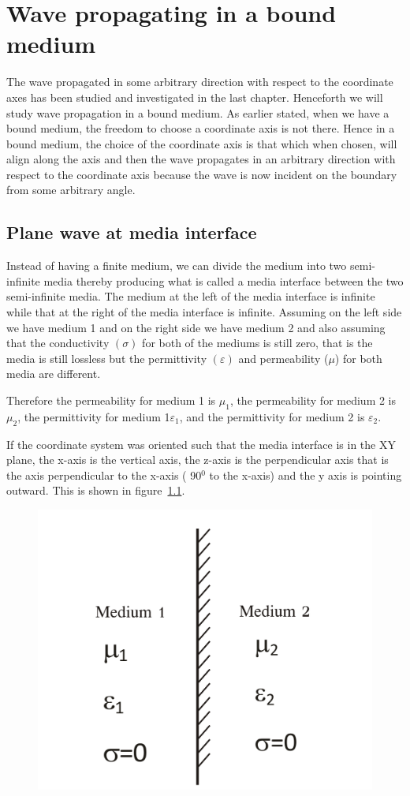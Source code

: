 \chapter{Wave propagating in a bound medium}
The wave propagated in some arbitrary direction with respect to the coordinate axes has been studied and investigated in the last chapter. Henceforth we will study wave propagation in a bound medium. As earlier stated, when we have a bound medium, the freedom to choose a coordinate axis is not there. Hence in a bound medium, the choice of the coordinate axis is that which when chosen, will align along the axis and then the wave propagates in an arbitrary direction with respect to the coordinate axis because the wave is now incident on the boundary from some arbitrary angle.

\section{Plane wave at media interface}

Instead of having a finite medium, we can divide the medium into two semi-infinite media thereby producing what is called a media interface between the two semi-infinite media. The medium at the left of the media interface is infinite while that at the right of the media interface is infinite. Assuming on the left side we have medium 1 and on the right side we have medium 2 and also assuming that the conductivity $(\sigma)$ for both of the mediums is still zero, that is the media is still lossless but the permittivity $(\varepsilon)$ and permeability ($\mu$) for both media are different.

Therefore the permeability for medium 1 is $\mu_1$, the permeability for medium 2 is $\mu_2$, the permittivity for medium 1$\varepsilon_1$, and the permittivity for medium 2 is $\varepsilon_2$.

If the coordinate system was oriented such that the media interface is in the XY plane, the x-axis is the vertical axis, the z-axis is the perpendicular axis that is the axis perpendicular to the x-axis ( 90$^{0}$ to the x-axis) and the y axis is pointing outward. This is shown in figure~\ref{fig:group30a}.
\begin{figure}[h]
\centering
\includegraphics[width=.7\linewidth]{./graphics/group30a}
\caption{}
\label{fig:group30a}
\end{figure}

